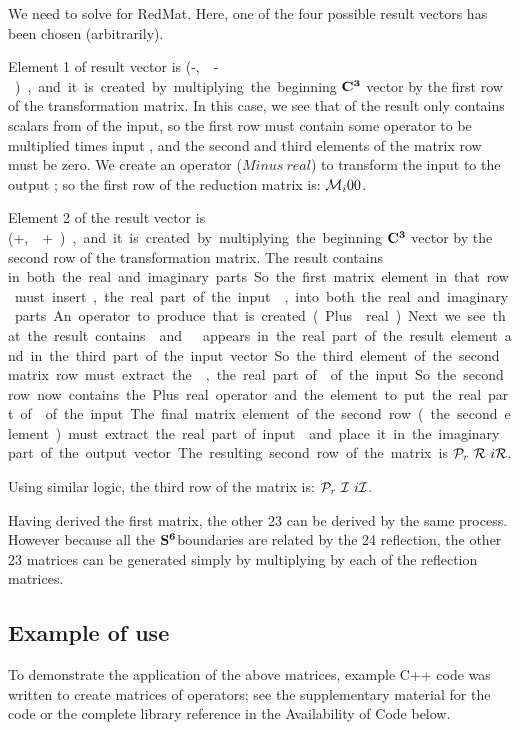 \documentclass[]{iucr}              %
\numberwithin{equation}{section}
\newcommand{\SVI}[0]{$\bf{S^{6}}$}
\newcommand{\CIII}[0]{$\bf{C^{3}}$}
\newcommand{\Imaginary}[0]{\mathcal{I}}
\newcommand{\Real}[0]{\mathcal{R}}
\begin{document}
We need to solve for RedMat.
Here, one of the four possible result vectors has been chosen 
(arbitrarily). 

Element 1 of result vector is (-\si,~\siv-\si ), and
it is created by multiplying the beginning \CIII{} vector by the
first row of the transformation matrix. In this case, we see
that \ci of the result only contains scalars from \ci of
the input, so the first row must contain some operator to
be multiplied times input \ci, and the second and third
elements of the matrix row must be zero. We create an operator
($Minus~real$) to transform the input \ci to the output \ci; so
the first row of the reduction matrix is: $\mathcal{M}{}_i	 0		 0$. 

Element 2 of the result vector is (\siii+\si,~\sii+\si),
and
it is created by multiplying the beginning \CIII{} vector by the
second row of the transformation matrix. The result \cii
contains \si in both the real and imaginary parts. So
the first matrix element in that row must insert \si, the
real part of the input \ci, into both the real and imaginary
parts. An operator to produce that is created 
(Plus{}~real). Next we see that the result contains \sii and \siii.
\siii appears in the real part of the result element and in the
third part of the input vector. So the third element of the 
second matrix row must extract the \siii, the real part of 
\ciii of the input. So the second row now contains the Plus real
operator and the element to put the  real part of \ciii of the input.
The final matrix element of the second row (the second element)
must extract the real part of input \cii and place it in the
imaginary part of the output vector. The resulting second
row of the matrix is $\Plus_r~\Real~i\Real$.

Using similar logic, the third row of the matrix is:
$\Plus_r~\Imaginary~i\Imaginary$.

Having derived the first matrix, the other 23 can
be derived by the same process. However because all the
\SVI boundaries are related by the 24 reflection, the
other 23 matrices can be generated simply
by multiplying by each of the reflection matrices.

\subsection{Example of use}

To demonstrate the application of the above matrices,
example C++ code was written to create matrices of operators;
see the supplementary material for the code or the complete
library reference in the Availability of Code below.
\end{document}
